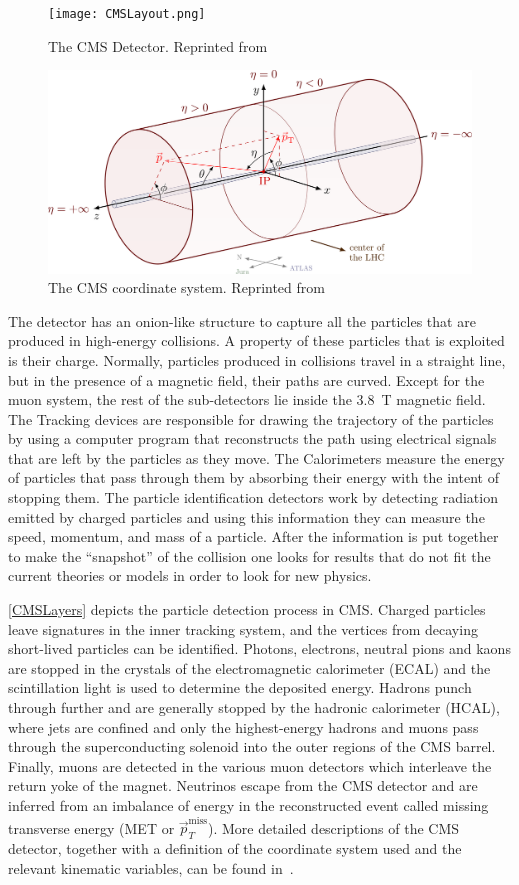 \begin{figure}
	\centering
	\texttt{[image: CMSLayout.png]}
	\caption[CMS Detector]{The CMS Detector. Reprinted from \cite{CMS_detector}}
	\label{CMSLayout}
\end{figure}
\begin{figure}
	\centering
	\includegraphics[width=.8\linewidth]{Images/CMS Coordinate.png}
	\caption[The CMS coordinate system]{The CMS coordinate system. Reprinted from \cite{izaakneutelings2024}}
	\label{fig:CMSCoord}
\end{figure}
The detector has an onion-like structure to capture all the particles that are produced in high-energy collisions.
A property of these particles that is exploited is their charge. Normally, particles produced in collisions travel in a straight line, but in the presence of a magnetic field, their paths are curved.
Except for the muon system, the rest of the sub-detectors lie inside the 3.8~\unit{T} magnetic field.
The Tracking devices are responsible for drawing the trajectory of the particles by using a computer program that reconstructs the path using electrical signals that are left by the particles as they move. The Calorimeters measure the energy of particles that pass through them by absorbing their energy with the intent of stopping them.
The particle identification detectors work by detecting radiation emitted by charged particles and using this information they can measure the speed, momentum, and mass of a particle. After the information is put together to make the “snapshot” of the collision one looks for results that do not fit the current theories or models in order to look for new physics.

\autoref{CMSLayers} depicts the particle detection process in CMS. Charged particles leave signatures in the inner tracking system, and the vertices from decaying short-lived particles can be identified. Photons, electrons, neutral pions and kaons are stopped in the crystals of the electromagnetic calorimeter (ECAL) and the scintillation light is used to determine the deposited energy. Hadrons punch through further and are generally stopped by the hadronic calorimeter (HCAL), where jets are confined and only the highest-energy hadrons and muons pass through the superconducting solenoid into the outer regions of the CMS barrel. Finally, muons are detected in the various muon detectors which interleave the return yoke of the magnet. Neutrinos escape from the CMS detector and are inferred from an imbalance of energy in the reconstructed event called missing transverse energy (MET or $\vec{p}_T^{\text{miss}}$).
More detailed descriptions of the CMS detector, together with a definition of the coordinate system used and the relevant kinematic variables, can be found in~\cite{CMS:2008xjf,CMS:2023gfb}.

